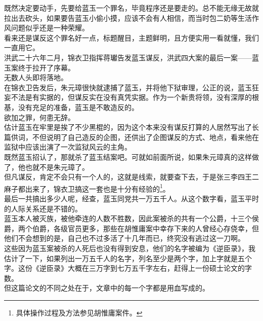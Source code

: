 \begin{multicols}{\theparacolNo}
既然决定要动手，先要给蓝玉一个罪名，毕竟程序还是要走的。总不能无缘无故就拉出去砍头，如果要告蓝玉小偷小摸，应该不会有人相信，而当时包二奶等生活作风问题似乎还是一种荣耀。\\

看来还是谋反这个罪名好一点，标题醒目，主题鲜明，且方便实用一看就懂，我们一直用它。\\

洪武二十六年二月，锦衣卫指挥蒋瓛告发蓝玉谋反，洪武四大案的最后一案——蓝玉案终于拉开了序幕。\\

无数人头即将落地。\\

在锦衣卫告发后，朱元璋很快就逮捕了蓝玉，并将他下狱审理，公正的说，蓝玉狂妄不法是有实据的，但谋反实在没有真凭实据。作为一个新贵将领，没有深厚的根基，没有充足的准备，蓝玉是不敢造反的。\\

欲加之罪，何患无辞。\\

估计蓝玉在牢里是挨了不少黑棍的，因为这个本来没有谋反打算的人居然写出了长篇供词，不但说明了自己造反的企图，还供出了企图谋反的方式、地点，看来他在监狱中应该出演了一次监狱风云的主角。\\

既然蓝玉招认了，那就杀了蓝玉结案吧。可就如前面所说，如果朱元璋真的这样做了，他也就不是朱元璋了。\\

但凡谋反，肯定不会只有一个人的，这就是线索，就要查下去，于是张三李四王二麻子都出来了，锦衣卫搞这一套也是十分有经验的\footnote{具体操作过程及方法参见胡惟庸案件。}。\\

最后一共搞出多少人呢，经查，蓝玉同党共一万五千人。从这个数字看，蓝玉平时的人际关系还是不错的。\\

蓝玉本人被灭族，被他牵连的人数不胜数，因此案被杀的共有一个公爵，十三个侯爵，两个伯爵，各级官员更多，那些在胡惟庸案中幸存下来的人曾经心存侥幸，但他们不会想到的是，自己也不过多活了十几年而已，终究没有逃过这一刀啊。\\

这些因为蓝玉案被杀的人死后也没有得到安息，他们的名字被编为《逆臣录》，我估计了一下，如果列出一万五千人的名字，列名至少是两个字，加上字就是五个字。这份《逆臣录》大概在三万字到七万五千字左右，赶得上一份硕士论文的字数。\\

但这篇论文的不同之处在于，文章中的每一个字都是用血写成的。\\


\end{multicols}
